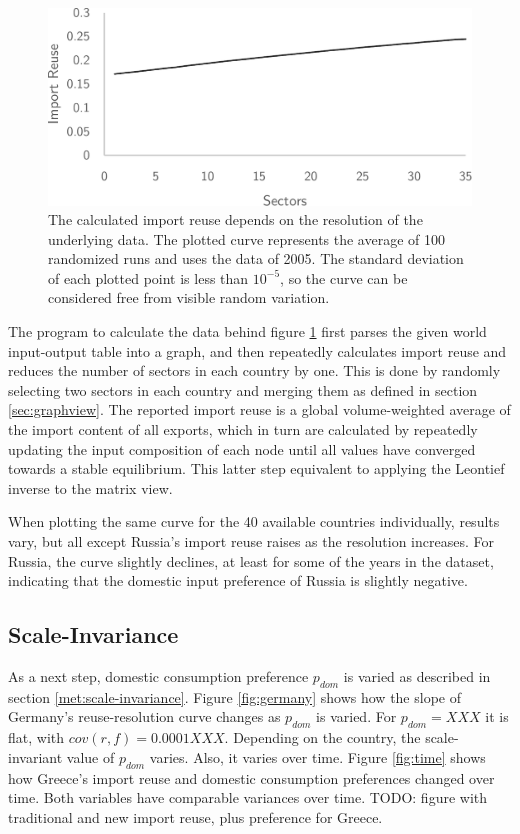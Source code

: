 \documentclass{paper}
\begin{document}
\begin{figure}
\centering
\includegraphics[scale=0.4]{../data/resolution}
\caption{The calculated import reuse depends on the resolution of the underlying data. The plotted curve represents the average of 100 randomized runs and uses the data of 2005. The standard deviation of each plotted point is less than $10^{-5}$, so the curve can be considered free from visible random variation.} \label{fig:varying}
\end{figure}

The program to calculate the data behind figure \ref{fig:varying} first parses the given world input-output table into a graph, and then repeatedly calculates import reuse and reduces the number of sectors in each country by one. This is done by randomly selecting two sectors in each country and merging them as defined in section \ref{sec:graphview}. The reported import reuse is a global volume-weighted average of the import content of all exports, which in turn are calculated by repeatedly updating the input composition of each node until all values have converged towards a stable equilibrium. This latter step equivalent to applying the Leontief inverse to the matrix view.

When plotting the same curve for the 40 available countries individually, results vary, but all except Russia's import reuse raises as the resolution increases. For Russia, the curve slightly declines, at least for some of the years in the dataset, indicating that the domestic input preference of Russia is slightly negative.

\subsection{Scale-Invariance}
As a next step, domestic consumption preference $p_{dom}$ is varied as described in section \ref{met:scale-invariance}. Figure \ref{fig:germany} shows how the slope of Germany's reuse-resolution curve changes as $p_{dom}$ is varied. For $p_{dom}=XXX$ it is flat, with $cov(r, f) = 0.0001 XXX$. Depending on the country, the scale-invariant value of $p_{dom}$ varies. Also, it varies over time. Figure \ref{fig:time} shows how Greece's import reuse and domestic consumption preferences changed over time. Both variables have comparable variances over time. TODO: figure with traditional and new import reuse, plus preference for Greece.
\end{document}
